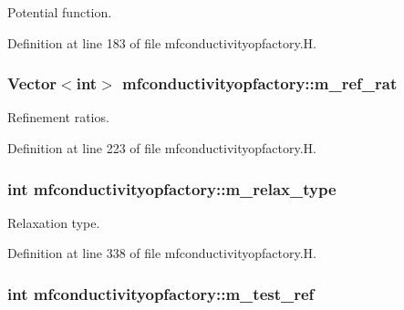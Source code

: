 Potential function. 



Definition at line 183 of file mfconductivityopfactory.\+H.

\subsubsection[{\texorpdfstring{m\+\_\+ref\+\_\+rat}{m_ref_rat}}]{\setlength{\rightskip}{0pt plus 5cm}Vector$<$int$>$ mfconductivityopfactory\+::m\+\_\+ref\+\_\+rat\hspace{0.3cm}{\ttfamily [protected]}}\hypertarget{classmfconductivityopfactory_aabc50b386478f0673828dbfbba071ba9}{}\label{classmfconductivityopfactory_aabc50b386478f0673828dbfbba071ba9}


Refinement ratios. 



Definition at line 223 of file mfconductivityopfactory.\+H.

\subsubsection[{\texorpdfstring{m\+\_\+relax\+\_\+type}{m_relax_type}}]{\setlength{\rightskip}{0pt plus 5cm}int mfconductivityopfactory\+::m\+\_\+relax\+\_\+type\hspace{0.3cm}{\ttfamily [protected]}}\hypertarget{classmfconductivityopfactory_aff70724abed17f410a0a4bef3b36a198}{}\label{classmfconductivityopfactory_aff70724abed17f410a0a4bef3b36a198}


Relaxation type. 



Definition at line 338 of file mfconductivityopfactory.\+H.

\subsubsection[{\texorpdfstring{m\+\_\+test\+\_\+ref}{m_test_ref}}]{\setlength{\rightskip}{0pt plus 5cm}int mfconductivityopfactory\+::m\+\_\+test\+\_\+ref\hspace{0.3cm}{\ttfamily [protected]}}\hypertarget{classmfconductivityopfactory_a751f71d35a148f7bc259ee881bb6c05a}{}\label{classmfconductivityopfactory_a751f71d35a148f7bc259ee881bb6c05a}


